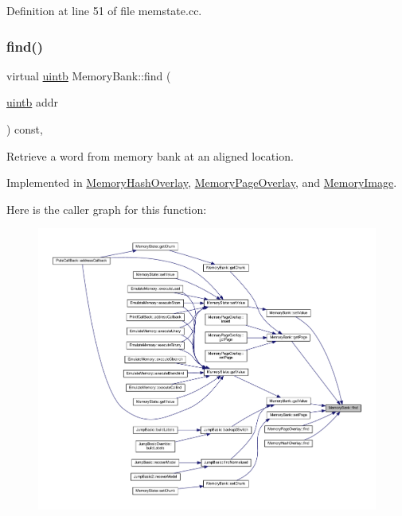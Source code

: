 Definition at line 51 of file memstate.\+cc.

\mbox{\label{class_memory_bank_a421a5b8dd872d0c3e462d9055fa4266d}} 
\subsubsection{\texorpdfstring{find()}{find()}}
{\footnotesize\ttfamily virtual \mbox{\hyperlink{types_8h_a2db313c5d32a12b01d26ac9b3bca178f}{uintb}} Memory\+Bank\+::find (\begin{DoxyParamCaption}\item[{\mbox{\hyperlink{types_8h_a2db313c5d32a12b01d26ac9b3bca178f}{uintb}}}]{addr }\end{DoxyParamCaption}) const\hspace{0.3cm}{\ttfamily [protected]}, {}}



Retrieve a word from memory bank at an aligned location. 



Implemented in \mbox{\hyperlink{class_memory_hash_overlay_aeef0c9ae78be16ddd22f8a58e1eef419}{Memory\+Hash\+Overlay}}, \mbox{\hyperlink{class_memory_page_overlay_a7ba248277eadf04ca7895dea1e614148}{Memory\+Page\+Overlay}}, and \mbox{\hyperlink{class_memory_image_a196464ef9a11a0088aa62d01e510aabf}{Memory\+Image}}.

Here is the caller graph for this function\+:
\nopagebreak
\begin{figure}[H]
\begin{center}
\leavevmode
\includegraphics[width=350pt]{class_memory_bank_a421a5b8dd872d0c3e462d9055fa4266d_icgraph}
\end{center}
\end{figure}
\mbox{\label{class_memory_bank_af45a81a70ff478940fac0399a2cfbe86}} 
